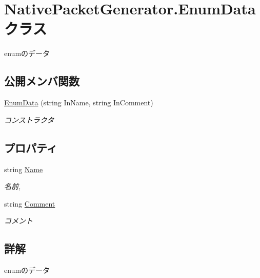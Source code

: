 \hypertarget{classNativePacketGenerator_1_1EnumData}{}\section{Native\+Packet\+Generator.\+Enum\+Data クラス}
\label{classNativePacketGenerator_1_1EnumData}


enumのデータ  


\subsection*{公開メンバ関数}
\begin{DoxyCompactItemize}
\item 
\mbox{\hyperlink{classNativePacketGenerator_1_1EnumData_a68edcaa080f5c8213a5f47bf690c42db}{Enum\+Data}} (string In\+Name, string In\+Comment)
\begin{DoxyCompactList}\small\item\em コンストラクタ \end{DoxyCompactList}\end{DoxyCompactItemize}
\subsection*{プロパティ}
\begin{DoxyCompactItemize}
\item 
string \mbox{\hyperlink{classNativePacketGenerator_1_1EnumData_a64cbf48233dcd6439a93a84195d86632}{Name}}
\begin{DoxyCompactList}\small\item\em 名前, \end{DoxyCompactList}\item 
string \mbox{\hyperlink{classNativePacketGenerator_1_1EnumData_a6d7159aca291bb0f721dcb900e6b18b7}{Comment}}
\begin{DoxyCompactList}\small\item\em コメント \end{DoxyCompactList}\end{DoxyCompactItemize}


\subsection{詳解}
enumのデータ 



